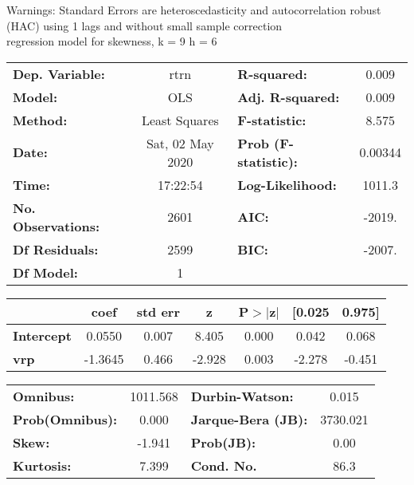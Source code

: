 Warnings: \newline
 [1] Standard Errors are heteroscedasticity and autocorrelation robust (HAC) using 1 lags and without small sample correction\\ 

regression model for skewness, k = 9 h = 6\begin{center}
\begin{tabular}{lclc}
\toprule
\textbf{Dep. Variable:}    &       rtrn       & \textbf{  R-squared:         } &     0.009   \\
\textbf{Model:}            &       OLS        & \textbf{  Adj. R-squared:    } &     0.009   \\
\textbf{Method:}           &  Least Squares   & \textbf{  F-statistic:       } &     8.575   \\
\textbf{Date:}             & Sat, 02 May 2020 & \textbf{  Prob (F-statistic):} &  0.00344    \\
\textbf{Time:}             &     17:22:54     & \textbf{  Log-Likelihood:    } &    1011.3   \\
\textbf{No. Observations:} &        2601      & \textbf{  AIC:               } &    -2019.   \\
\textbf{Df Residuals:}     &        2599      & \textbf{  BIC:               } &    -2007.   \\
\textbf{Df Model:}         &           1      & \textbf{                     } &             \\
\bottomrule
\end{tabular}
\begin{tabular}{lcccccc}
                   & \textbf{coef} & \textbf{std err} & \textbf{z} & \textbf{P$> |$z$|$} & \textbf{[0.025} & \textbf{0.975]}  \\
\midrule
\textbf{Intercept} &       0.0550  &        0.007     &     8.405  &         0.000        &        0.042    &        0.068     \\
\textbf{vrp}       &      -1.3645  &        0.466     &    -2.928  &         0.003        &       -2.278    &       -0.451     \\
\bottomrule
\end{tabular}
\begin{tabular}{lclc}
\textbf{Omnibus:}       & 1011.568 & \textbf{  Durbin-Watson:     } &    0.015  \\
\textbf{Prob(Omnibus):} &   0.000  & \textbf{  Jarque-Bera (JB):  } & 3730.021  \\
\textbf{Skew:}          &  -1.941  & \textbf{  Prob(JB):          } &     0.00  \\
\textbf{Kurtosis:}      &   7.399  & \textbf{  Cond. No.          } &     86.3  \\
\bottomrule
\end{tabular}
\end{center}

